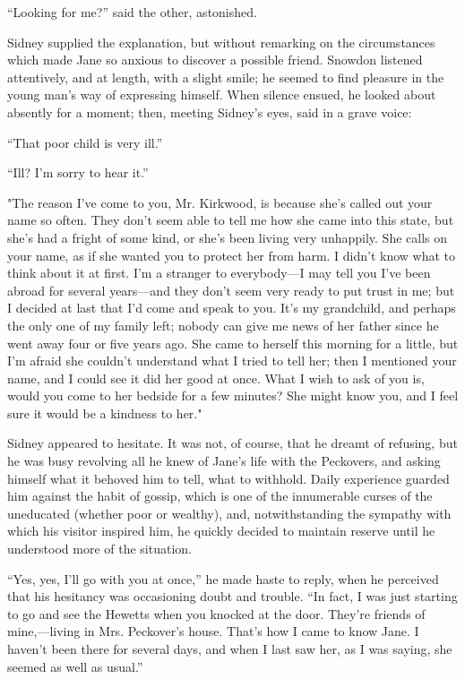 ``Looking for me?'' said the other, astonished.

Sidney supplied the explanation, but without remarking on the
circumstances which made Jane so anxious to discover a possible friend.
Snowdon listened attentively, and at length, with a slight smile; he
seemed to find pleasure in the young man's way of expressing himself.
When silence ensued, he looked about absently for a moment; then,
meeting Sidney's eyes, said in a grave voice:

``That poor child is very ill.''

``Ill? I'm sorry to hear it.''

"The reason I've come to you, Mr. Kirkwood, is because she's called out
your name so often. They don't seem able to tell me
{\protect\hypertarget{146}{}{}}how she came into this state, but she's
had a fright of some kind, or she's been living very unhappily. She
calls on your name, as if she wanted you to protect her from harm. I
didn't know what to think about it at first. I'm a stranger to
everybody---I may tell you I've been abroad for several years---and they
don't seem very ready to put trust in me; but I decided at last that I'd
come and speak to you. It's my grandchild, and perhaps the only one of
my family left; nobody can give me news of her father since he went away
four or five years ago. She came to herself this morning for a little,
but I'm afraid she couldn't understand what I tried to tell her; then I
mentioned your name, and I could see it did her good at once. What I
wish to ask of you is, would you come to her bedside for a few minutes?
She might know you, and I feel sure it would be a kindness to her."

Sidney appeared to hesitate. It was not, of course, that he dreamt of
refusing, but he was busy revolving all he knew of Jane's life with the
Peckovers, and asking himself {\protect\hypertarget{147}{}{}}what it
behoved him to tell, what to withhold. Daily experience guarded him
against the habit of gossip, which is one of the innumerable curses of
the uneducated (whether poor or wealthy), and, notwithstanding the
sympathy with which his visitor inspired him, he quickly decided to
maintain reserve until he understood more of the situation.

``Yes, yes, I'll go with you at once,'' he made haste to reply, when he
perceived that his hesitancy was occasioning doubt and trouble. ``In
fact, I was just starting to go and see the Hewetts when you knocked at
the door. They're friends of mine,---living in Mrs. Peckover's house.
That's how I came to know Jane. I haven't been there for several days,
and when I last saw her, as I was saying, she seemed as well as usual.''

